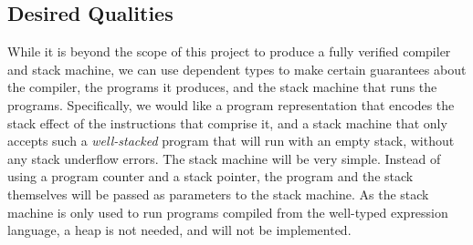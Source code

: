 \subsection{Desired Qualities}
While it is beyond the scope of this project to produce a fully verified compiler and stack machine, we can use dependent types to make certain guarantees about the compiler, the programs it produces, and the stack machine that runs the programs. Specifically, we would like a program representation that encodes the stack effect of the instructions that comprise it, and a stack machine that only accepts such a \textit{well-stacked} program that will run with an empty stack, without any stack underflow errors. The stack machine will be very simple. Instead of using a program counter and a stack pointer, the program and the stack themselves will be passed as parameters to the stack machine. As the stack machine is only used to run programs compiled from the well-typed expression language, a heap is not needed, and will not be implemented.




